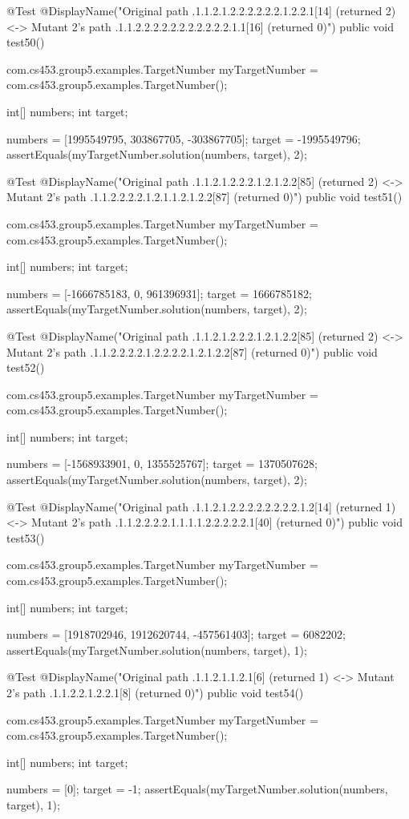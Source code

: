@Test
@DisplayName("Original path .1.1.2.1.2.2.2.2.2.2.1.2.2.1[14] (returned 2) <-> Mutant 2's path .1.1.2.2.2.2.2.2.2.2.2.2.2.1.1[16] (returned 0)")
public void test50() {
    com.cs453.group5.examples.TargetNumber myTargetNumber = com.cs453.group5.examples.TargetNumber();

    int[] numbers;
    int target;

    numbers = [1995549795, 303867705, -303867705];
    target = -1995549796;
    assertEquals(myTargetNumber.solution(numbers, target), 2);
}

@Test
@DisplayName("Original path .1.1.2.1.2.2.2.1.2.1.2.2[85] (returned 2) <-> Mutant 2's path .1.1.2.2.2.2.1.2.1.1.2.1.2.2[87] (returned 0)")
public void test51() {
    com.cs453.group5.examples.TargetNumber myTargetNumber = com.cs453.group5.examples.TargetNumber();

    int[] numbers;
    int target;

    numbers = [-1666785183, 0, 961396931];
    target = 1666785182;
    assertEquals(myTargetNumber.solution(numbers, target), 2);
}

@Test
@DisplayName("Original path .1.1.2.1.2.2.2.1.2.1.2.2[85] (returned 2) <-> Mutant 2's path .1.1.2.2.2.2.1.2.2.2.2.1.2.1.2.2[87] (returned 0)")
public void test52() {
    com.cs453.group5.examples.TargetNumber myTargetNumber = com.cs453.group5.examples.TargetNumber();

    int[] numbers;
    int target;

    numbers = [-1568933901, 0, 1355525767];
    target = 1370507628;
    assertEquals(myTargetNumber.solution(numbers, target), 2);
}

@Test
@DisplayName("Original path .1.1.2.1.2.2.2.2.2.2.2.2.1.2[14] (returned 1) <-> Mutant 2's path .1.1.2.2.2.2.1.1.1.1.2.2.2.2.2.1[40] (returned 0)")
public void test53() {
    com.cs453.group5.examples.TargetNumber myTargetNumber = com.cs453.group5.examples.TargetNumber();

    int[] numbers;
    int target;

    numbers = [1918702946, 1912620744, -457561403];
    target = 6082202;
    assertEquals(myTargetNumber.solution(numbers, target), 1);
}

@Test
@DisplayName("Original path .1.1.2.1.1.2.1[6] (returned 1) <-> Mutant 2's path .1.1.2.2.1.2.2.1[8] (returned 0)")
public void test54() {
    com.cs453.group5.examples.TargetNumber myTargetNumber = com.cs453.group5.examples.TargetNumber();

    int[] numbers;
    int target;

    numbers = [0];
    target = -1;
    assertEquals(myTargetNumber.solution(numbers, target), 1);
}

